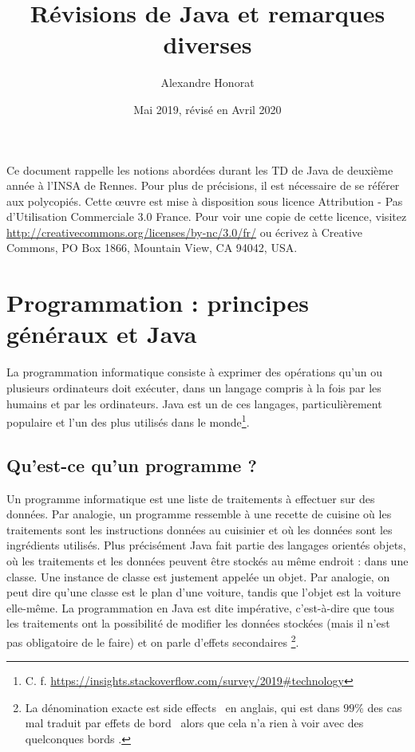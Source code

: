 \documentclass[10pt]{article}
\title{Révisions de Java et remarques diverses}
\author{Alexandre Honorat}
\date{Mai 2019, révisé en Avril 2020}
\begin{document}
\maketitle

Ce document rappelle les notions abordées durant les TD de Java de deuxième année
à l'INSA de Rennes. Pour plus de précisions, il est nécessaire de se référer aux polycopiés.
Cette œuvre est mise à disposition sous licence
Attribution - Pas d’Utilisation Commerciale 3.0 France.
Pour voir une copie de cette licence, visitez \url{http://creativecommons.org/licenses/by-nc/3.0/fr/}
ou écrivez à Creative Commons, PO Box 1866, Mountain View, CA 94042, USA.

\section{Programmation : principes généraux et Java}


La programmation informatique consiste à exprimer des opérations
qu'un ou plusieurs ordinateurs doit exécuter, dans un langage compris
à la fois par les humains et par les ordinateurs. Java est un de ces langages,
particulièrement populaire et l'un des plus utilisés dans le monde\footnote{C. f. \url{https://insights.stackoverflow.com/survey/2019\#technology}}.


\subsection{Qu'est-ce qu'un programme ?}

Un programme informatique est une liste de traitements à effectuer sur des données. Par analogie, un programme
ressemble à une recette de cuisine où les traitements sont les instructions données au cuisinier
et où les données sont les ingrédients utilisés. Plus précisément Java fait partie des langages
orientés objets, où les traitements et les données peuvent être stockés au même endroit : dans une
classe. Une instance de classe est justement appelée un objet. Par analogie, on peut dire qu'une classe
est le plan d'une voiture, tandis que l'objet est la voiture elle-même.
La programmation en Java est dite impérative, c'est-à-dire que tous les traitements
ont la possibilité de modifier les données stockées (mais il n'est pas obligatoire de le faire) et on parle
d'effets secondaires \footnote{La dénomination exacte est \og side effects \fg~en anglais, qui est dans $99\%$
des cas mal traduit par \og effets de bord \fg~alors que cela n'a rien à voir avec des quelconques \og bords \fg.}.
\end{document}
